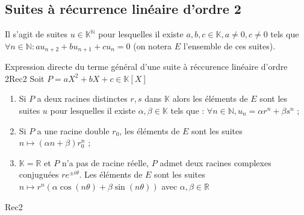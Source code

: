 \documentclass[12pt,a4paper]{report}
\begin{document}
\subsection{Suites à récurrence linéaire d'ordre 2}
Il s'agit de suites $u \in \mathbb{K}^\mathbb{N}$ pour lesquelles il existe $a,b,c \in \mathbb{K}, a \neq 0, c\neq 0$ tels que $\forall n \in \mathbb{N} : au_{n+2}+bu_{n+1}+cu_n=0$ (on notera $E$ l'ensemble de ces suites).

\begin{theoreme}{Expression directe du terme général d'une suite à réccurence linéaire d'ordre 2}{Rec2}
Soit $P = aX^2+bX+c \in \mathbb{K}\left[X\right]$
\begin{enumerate}
\item Si $P$ a deux racines distinctes $r,s$ dans $\mathbb{K}$ alors les éléments de $E$ sont les suites $u$ pour lesquelles il existe $\alpha,\beta \in \mathbb{K}$ tels que : 
\newline $\forall n \in \mathbb{N}, u_n = \alpha r^n + \beta s^n$ ;
\item Si $P$ a une racine double $r_0$, les éléments de $E$ sont les suites $n \mapsto (\alpha n + \beta)r_0^n$ ;
\item $\mathbb{K} = \mathbb{R}$ et $P$ n'a pas de racine réelle, $P$ admet deux racines complexes conjuguées $re^{\pm i\theta}$. Les éléments de $E$ sont les suites $n \mapsto r^n(\alpha \cos (n\theta) + \beta \sin (n\theta))$ avec $\alpha,\beta \in \mathbb{R}$
\end{enumerate}
\end{theoreme}

\begin{principedemo}{Rec2}

\end{principedemo}
\end{document}
